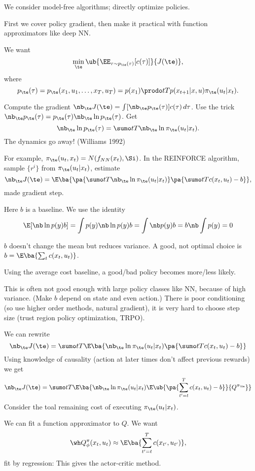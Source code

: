 We consider model-free algorithms; directly optimize policies.

First we cover policy gradient, then make it practical with function approximators like deep NN.

We want
$$
\min_\te\ub{\EE_{\tau \sim p_\te(\tau)} [c(\tau)]}{J(\te)},
$$
where
$$p_\te(\tau) = p_\te(x_1,u_1,\ldots, x_T,u_T) = p(x_1) \prodo tT p(x_{t+1}|x,u)\pi_\te(u_t|x_t).$$

Compute the gradient $\nb_\te J(\te) = \int[\nb_\te p_\te(\tau)] c(\tau)\,d\tau$. Use the trick $\nb_\te p_\te (\tau) = p_\te(\tau) \nb_\te \ln p_\te(\tau)$. Get
$$
\nb_\te\ln p_\te(\tau) = \sumo tT \nb_\te \ln \pi_\te(u_t|x_t).
$$
The dynamics go away! (Williams 1992)

For example, $\pi_\te(u_t,x_t) = N(f_{NN}(x_t),\Si)$.
In the REINFORCE algorithm, sample $\{r^i\}$ from $\pi_\te(u_t|x_t)$, estimate $$\nb_\te J(\te) = \E\ba{\pa{\sumo tT \nb_\te \ln \pi_\te(u_t|x_t)}\pa{\sumo tT c(x_t,u_t)-b}},$$ made gradient step. %

Here $b$ is a baseline. 
We use the identity
$$
\E [\nb \ln p(y)b ] = \int p(y) \nb \ln p(y)b = \int \nb p(y) b = b \nb \int p(y) = 0
$$

$b$ doesn't change the mean but reduces variance. A good, not optimal choice is $b=\E\ba{\sum_t c(x_t,u_t)}$.

Using the average cost baseline, a good/bad policy becomes more/less likely.

This is often not good enough with large policy classes like NN,  because of high variance. (Make  $b$ depend on state and even action.) There is poor conditioning (so use higher order methods, natural gradient), it is very hard to choose step size (trust region policy optimization, TRPO).

We can rewrite
$$
\nb_\te J(\te) = \sumo tT 
\E\ba{\nb_\te \ln \pi_\te(u_t|x_t)\pa{\sumo tT c(x_t,u_t)-b}}
$$
Using knowledge of causality (action at later times don't affect previous rewards) we get
$$
\nb_\te J(\te) = \sumo tT 
\E\ba{\nb_\te \ln \pi_\te(u_t|x_t) \E\ub{\pa{\sum_{t'=t}^T c(x_t,u_t)-b}}{Q^{\pi_\te}}}
$$
Consider the toal remaining cost of executing $\pi_\te(u_t|x_t)$.

We can fit a function approximator to $Q$.
We want
$$
\wh Q_\phi^\pi (x_t, u_t)\approx \E\ba{\sum_{t'=t}^T c(x_{t'},u_{t'})},
$$
fit by regression:
This gives the actor-critic method.

